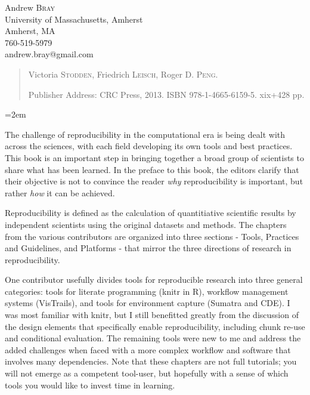 \documentclass[12pt]{article}
\begin{document}
\noindent
Andrew \textsc{Bray}\\
University of Massachusetts, Amherst \\
Amherst, MA \\
760-519-5979 \\
andrew.bray@gmail.com\\
\medskip

\begin{quote}
Victoria \textsc{Stodden},
Friedrich \textsc{Leisch},
Roger D. \textsc{Peng}.

Publisher Address: CRC Press, 2013. ISBN 978-1-4665-6159-5. 
xix+428 pp. 
\end{quote}

\thispagestyle{empty}
\raggedright\baselineskip=18pt\parindent=2em\parskip=5pt

The challenge of reproducibility in the computational era is 
being dealt with across the sciences, with each field developing its own
 tools and best practices.  This book is an important step in bringing together
 a broad group of scientists to share what has been learned.  In the preface 
to this book, the editors clarify that their objective is not to convince the reader
 \emph{why} reproducibility is important, but rather \emph{how} it can be 
achieved.

Reproducibility is defined as the calculation of quantitiative scientific results by
independent scientists using the original datasets and methods. The chapters 
from the various contributors are organized into three sections - Tools, Practices
 and Guidelines, and Platforms - that mirror the three directions of research in 
reproducibility.

One contributor usefully divides tools for reproducible research into three 
general categories: tools for literate programming (knitr in R), workflow management 
systems (VisTrails), and tools for environment capture (Sumatra and CDE). 
I was most familiar with knitr, but I still benefitted greatly from the discussion
 of the design elements that specifically enable reproducibility, including chunk 
re-use and conditional evaluation. The remaining tools were new to me and address
the added challenges when faced with a more complex workflow and software that
involves many dependencies. Note that these chapters are not full
tutorials; you will not emerge as a competent tool-user, but hopefully with a 
sense of which tools you would like to invest time in learning.
\end{document}
